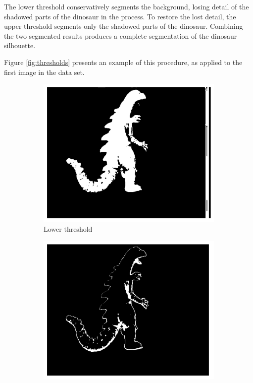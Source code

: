 The lower threshold conservatively segments the background, losing detail of the shadowed parts of the dinosaur in the process. To restore the lost detail, the upper threshold segments only the shadowed parts of the dinosaur. Combining the two segmented results produces a complete segmentation of the dinosaur silhouette.

Figure \ref{fig:thresholds} presents an example of this procedure, as applied to the first image in the data set.

\begin{figure}[ht]
  \centering
  \begin{subfigure}[b]{0.25\textwidth}
    \centering
    \includegraphics[width=\textwidth]{images/q2_masked_img_1.png}
    \caption{Lower threshold}
  \end{subfigure}
  \hspace{1em}
  \begin{subfigure}[b]{0.25\textwidth}
    \centering
    \includegraphics[width=\textwidth]{images/q2_masked_img_2.png}

\end{subfigure}
\end{figure}
